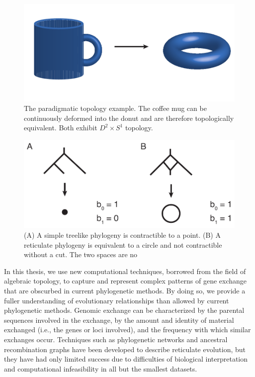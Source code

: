 \begin{figure}[t]
\centering
\includegraphics[width=\columnwidth]{./fig/introduction/coffeemug_to_donut.pdf}
\caption[The coffee mug and the donut]{The paradigmatic topology example. The coffee mug can be continuously deformed into the donut and are therefore topologically equivalent. Both exhibit $D^2\times S^1$ topology.}
\label{intro:fig:coffeemug_to_donut}
\end{figure}

\begin{figure}
\centering
\includegraphics[width=.8\columnwidth]{./fig/introduction/simple_tree_example.pdf}
\caption[Treelike and reticulate phylogenies]{(A) A simple treelike phylogeny is contractible to a point. (B) A reticulate phylogeny is equivalent to a circle and not contractible without a cut. The two spaces are no}
\label{intro:fig:simple_tree_example}
\end{figure}

In this thesis, we use new computational techniques, borrowed from the field of algebraic topology, to capture and represent complex patterns of gene exchange that are obscurbed in current phylogenetic methods.
By doing so, we provide a fuller understanding of evolutionary relationships than allowed by current phylogenetic methods.
Genomic exchange can be characterized by the parental sequences involved in the exchange, by the amount and identity of material exchanged (i.e., the genes or loci involved), and the frequency with which similar exchanges occur.
Techniques such as phylogenetic networks and ancestral recombination graphs have been developed to describe reticulate evolution, but they have had only limited success due to difficulties of biological interpretation and computational infeasibility in all but the smallest datasets.

